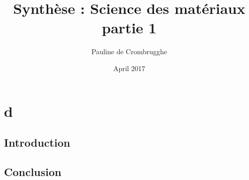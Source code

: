 \documentclass{article}
\title{Synthèse : Science des matériaux partie 1}
\author{Pauline de Crombrugghe}
\date{April 2017}
\begin{document}
\maketitle

\chapter{d}


\section{Introduction}


\section{Conclusion}
\end{document}
